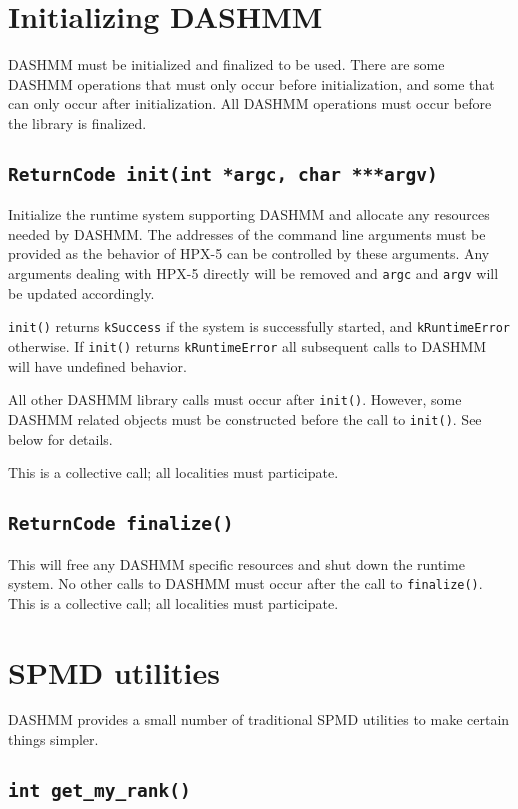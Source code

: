 \documentclass[11pt]{book}
\begin{document}
\section{Initializing DASHMM} 

DASHMM must be initialized and finalized to be used. There are some DASHMM
operations that must only occur before initialization, and some that can only
occur after initialization. All DASHMM operations must occur before the
library is finalized.

\subsection{{\tt ReturnCode init(int *argc, char ***argv)}}

Initialize the runtime system supporting DASHMM and allocate any resources
needed by DASHMM. The addresses of the command line arguments must be
provided as the behavior of HPX-5 can be controlled by these arguments. Any
arguments dealing with HPX-5 directly will be removed and {\tt argc} and 
{\tt argv} will be updated accordingly.

{\tt init()} returns {\tt kSuccess} if the system is successfully started, and
{\tt kRuntimeError} otherwise. If {\tt init()} returns {\tt kRuntimeError} all
subsequent calls to DASHMM will have undefined behavior.

All other DASHMM library calls must occur after {\tt init()}. However, some
DASHMM related objects must be constructed before the call to {\tt init()}. See
below for details.

This is a collective call; all localities must participate.

\subsection{{\tt ReturnCode finalize()}}

This will free any DASHMM specific resources and shut down the runtime system.
No other calls to DASHMM must occur after the call to {\tt finalize()}. This is
a collective call; all localities must participate.


\section{SPMD utilities} 

DASHMM provides a small number of traditional SPMD utilities to make certain
things simpler.

\subsection{{\tt int get\_my\_rank()}}
\end{document}
